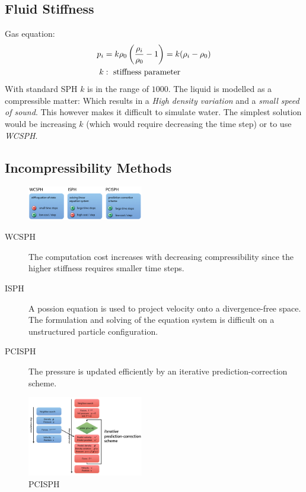 \begin{multicols}{2}
\subsection{Fluid Stiffness}
Gas equation:
\begin{align*}
	p_i &= k\rho_0 \left({\rho_i \over \rho_0} - 1\right) = k(\rho_i-\rho_0)\\
	k &: \text{ stiffness parameter}
\end{align*}
With standard SPH $k$ is in the range of $1000$. The liquid is modelled as a compressible matter: Which results in a \emph{High density variation} and a \emph{small speed of sound}. This however makes it difficult to simulate water. The simplest solution would be increasing $k$ (which would require decreasing the time step) or to use \emph{WCSPH}.

\subsection{Incompressibility Methods}

\begin{figure}[H]
	\centering
	\includegraphics[width=0.45\textwidth]{img/05_incompressibility_methods}
\end{figure}
\begin{description}
	\item[WCSPH] The computation cost increases with decreasing compressibility since the higher stiffness requires smaller time steps.
	\item[ISPH] A possion equation is used to project velocity onto a divergence-free space. The formulation and solving of the equation system is difficult on a unstructured particle configuration.
	\item[PCISPH] The pressure is updated efficiently by an iterative prediction-correction scheme.
\end{description}

\begin{figure}[H]
	\centering
	\includegraphics[width=0.45\textwidth]{img/05_pcisph}
	\caption{PCISPH}
\end{figure}





 


\end{multicols}